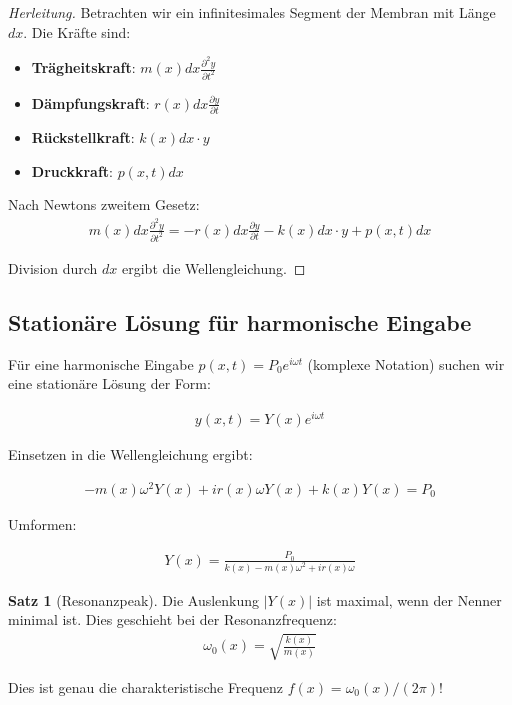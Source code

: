 ﻿\documentclass[a4paper,12pt]{report}
\theoremstyle{definition}
\newtheorem{satz}{Satz}
\begin{document}
	\begin{proof}[Herleitung]
		Betrachten wir ein infinitesimales Segment der Membran mit Länge $dx$. Die Kräfte sind:
		\begin{itemize}
			\item[-] \textbf{Trägheitskraft}: $m(x) dx \frac{\partial^2 y}{\partial t^2}$
			\item[-] \textbf{Dämpfungskraft}: $r(x) dx \frac{\partial y}{\partial t}$
			\item[-] \textbf{Rückstellkraft}: $k(x) dx \cdot y$
			\item[-] \textbf{Druckkraft}: $p(x,t) dx$
		\end{itemize}
		
		Nach Newtons zweitem Gesetz:
		\begin{align}
			m(x) dx \frac{\partial^2 y}{\partial t^2} = -r(x) dx \frac{\partial y}{\partial t} - k(x) dx \cdot y + p(x,t) dx
		\end{align}
		
		Division durch $dx$ ergibt die Wellengleichung.
	\end{proof}
	
	\subsection{Stationäre Lösung für harmonische Eingabe}
	
	Für eine harmonische Eingabe $p(x,t) = P_0 e^{i\omega t}$ (komplexe Notation) suchen wir eine stationäre Lösung der Form:
	
	\begin{align}
		y(x,t) = Y(x) e^{i\omega t}
	\end{align}
	
	Einsetzen in die Wellengleichung ergibt:
	
	\begin{align}
		-m(x) \omega^2 Y(x) + i r(x) \omega Y(x) + k(x) Y(x) = P_0
	\end{align}
	
	Umformen:
	
	\begin{align}
		Y(x) = \frac{P_0}{k(x) - m(x)\omega^2 + i r(x) \omega}
	\end{align}
	
	\begin{satz}[Resonanzpeak]
		Die Auslenkung $|Y(x)|$ ist maximal, wenn der Nenner minimal ist. Dies geschieht bei der Resonanzfrequenz:
		\begin{align}
			\omega_0(x) = \sqrt{\frac{k(x)}{m(x)}}
		\end{align}
		
		Dies ist genau die charakteristische Frequenz $f(x) = \omega_0(x) / (2\pi)$!
	\end{satz}
	
\end{document}
